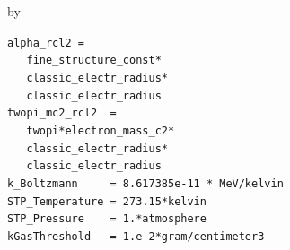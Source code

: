 \documentclass[twoside]{article}
\newcommand{\entrylabel}[1]{\mbox{\textbf{{#1}}}\hfil}%
\newenvironment{entry}
{\begin{list}{}%
    {\renewcommand{\makelabel}{\entrylabel}%
     \setlength{\labelwidth}{90pt}%
     \setlength{\leftmargin}{\labelwidth}
     \advance\leftmargin by \labelsep%
      }%
    }%
  {\end{list}}
\newcommand{\Entrylabel}[1]%
{\raisebox{0pt}[1ex][0pt]{\makebox[\labelwidth][l]%
    {\parbox[t]{\labelwidth}{\hspace{0pt}\textbf{{#1}}}}}}
\newenvironment{Entry}%
{\renewcommand{\entrylabel}{\Entrylabel}\begin{entry}}%
  {\end{entry}}
\begin{document}
\begin{Entry}
  \verb+alpha_rcl2 =+ \\
  \verb+   fine_structure_const*+ \\
  \verb+   classic_electr_radius*+\\
  \verb+   classic_electr_radius+ \\ 
  \verb+twopi_mc2_rcl2  =+ \\
  \verb+   twopi*electron_mass_c2*+ \\
  \verb+   classic_electr_radius*+\\
  \verb+   classic_electr_radius+ \\
  \verb+k_Boltzmann     = 8.617385e-11 * MeV/kelvin+ \\
  \verb+STP_Temperature = 273.15*kelvin+ \\
  \verb+STP_Pressure    = 1.*atmosphere+ \\
  \verb+kGasThreshold   = 1.e-2*gram/centimeter3+ \\
\end{Entry}
\newpage

%
%
\end{document}
